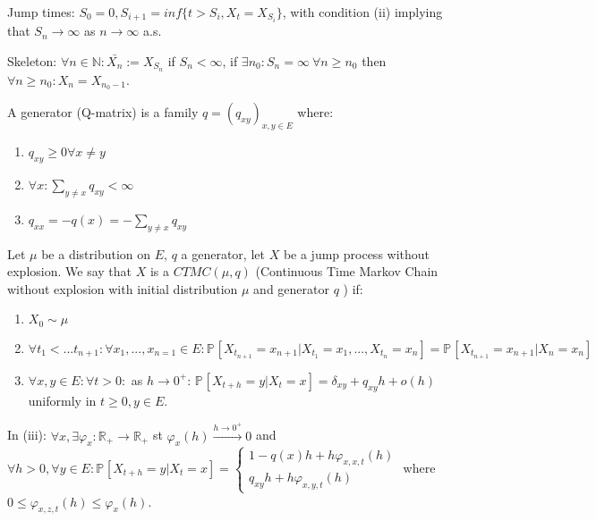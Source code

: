 \begin{defn}
	Jump times: $S_0 =0, S_{i+1} = inf\{t > S_i, X_t = X_{S_i}\}$, with condition (ii) implying that $S_n \to \infty $ as $n \to \infty $ a.s.
\end{defn}

\begin{defn}
	Skeleton: $\forall n \in \mathbb{N}: \bar{X_n} := X_{S_n}$ if $S _n< \infty$, if $\exists n_0: S_n = \infty \ \forall n \geq n_0$ then $\forall n \geq n_0: X_n = X_{n_0 -1}$.
\end{defn}

\begin{defn}
	A generator (Q-matrix) is a family $q=(q_{xy})_{x,y \in E}$ where:
	\begin{enumerate}
		\item $q_{xy} \geq 0 \forall x \neq y$
		\item $\forall x: \sum_{y \neq x}^{} q_{xy} < \infty$
		\item $q_{xx}= -q(x) =  -\sum_{y \neq x}^{} q_{xy}$
\end{enumerate}

\end{defn}


\begin{defn}
	Let $\mu $ be a distribution on $E$, $q$ a generator, let $X$ be a jump process without explosion. We say that $X$ is a $CTMC(\mu, q)$ (Continuous Time Markov Chain without explosion with initial distribution $\mu $ and generator $q$ ) if:
\begin{enumerate}
	\item $X_0 \sim \mu $ 
	\item $\forall t_1 <...t_{n+1}: \forall x_1,...,x_{n=1} \in E: \mathbb{P}_{} \left[ X_{t_{n+1}} = x_{n+1} | 
		X_{t_1}=x_1,...,X_{t_{n}}=x_n \right] = \mathbb{P}_{} \left[ X_{t_{n+1}} = x_{n+1} | X_{n}=x_n \right] $
	\item $\forall x,y \in  E: \forall t> 0:$ as $h \to 0^+$:  $\mathbb{P}_{} \left[ X_{t+h}=y | X _{t}=x \right]  = \delta_{xy} + q_{xy}h + o(h)$ uniformly in $t\geq 0, y \in E$.
\end{enumerate}

\end{defn}

\begin{rmk}[]
	In (iii): $\forall x, \exists \varphi_x: \mathbb{R}_+ \to \mathbb{R}_+$ st $\varphi_x(h) \stackrel{h \to 0^+}{\to}0$ and $\forall h> 0, \forall y \in E: \mathbb{P}_{} \left[ X_{t+h}=y |  X_{t}=x \right] = 
	\begin{cases}
		1 - q(x)h + h \varphi_{x,x,t}(h) \\
		q_{xy}h + h \varphi_{x,y,t}(h)
	\end{cases}
	$ where $0 \leq \varphi_{x,z,t}(h) \leq \varphi_x(h)$.
\end{rmk}

